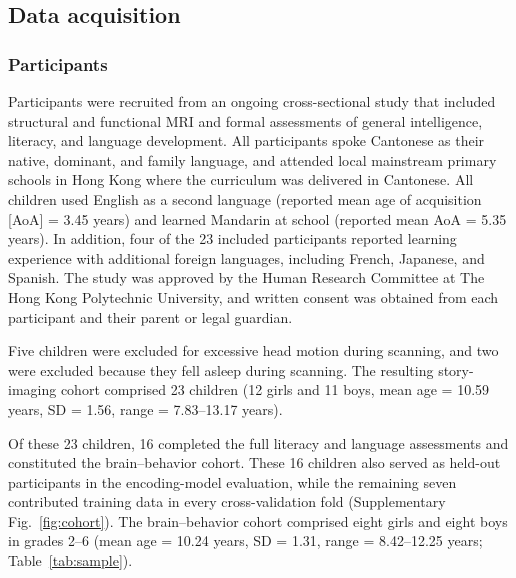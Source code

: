 \subsection{Data acquisition}



\subsubsection{Participants}
Participants were recruited from an ongoing cross-sectional study that included structural and functional MRI and formal assessments of general intelligence, literacy, and language development. All participants spoke Cantonese as their native, dominant, and family language, and attended local mainstream primary schools in Hong Kong where the curriculum was delivered in Cantonese. All children used English as a second language (reported mean age of acquisition [AoA] = 3.45 years) and learned Mandarin at school (reported mean AoA = 5.35 years). In addition, four of the 23 included participants reported learning experience with additional foreign languages, including French, Japanese, and Spanish. The study was approved by the Human Research Committee at The Hong Kong Polytechnic University, and written consent was obtained from each participant and their parent or legal guardian.

Five children were excluded for excessive head motion during scanning, and two were excluded because they fell asleep during scanning. The resulting story-imaging cohort comprised 23 children (12 girls and 11 boys, mean age = 10.59 years, SD = 1.56, range = 7.83–13.17 years).

Of these 23 children, 16 completed the full literacy and language assessments and constituted the brain–behavior cohort. These 16 children also served as held-out participants in the encoding-model evaluation, while the remaining seven contributed training data in every cross-validation fold (Supplementary Fig.~\ref{fig:cohort}). The brain–behavior cohort comprised eight girls and eight boys in grades 2–6 (mean age = 10.24 years, SD = 1.31, range = 8.42–12.25 years; Table~\ref{tab:sample}).

